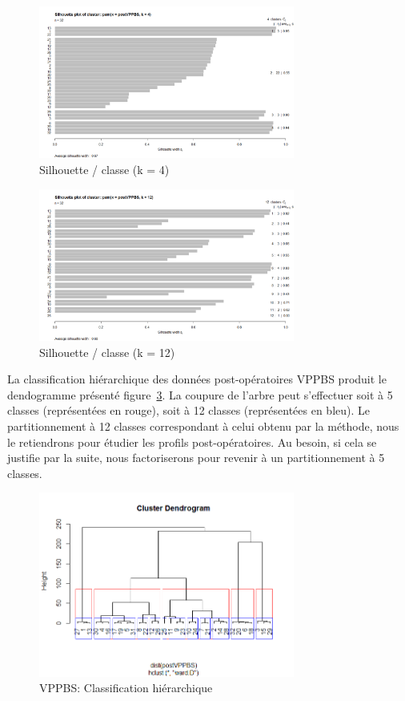 \begin{figure}[H]
\centering
\includegraphics[width=0.75\textwidth]{../Fig/VPPBS/vppbs-sil-k4-post.png}
\caption{Silhouette / classe (k = 4)}
\label{fig-vppbs-post-pam-k4}
\end{figure}


\begin{figure}[H]
\centering
\includegraphics[width=0.75\textwidth]{../Fig/VPPBS/vppbs-sil-k12-post.png}
\caption{Silhouette / classe (k = 12)}
\label{fig-vppbs-post-pam-k12}
\end{figure}

La classification hiérarchique des données post-opératoires VPPBS produit le dendogramme présenté figure~\ref{fig-vppbs-post-cah}. La coupure de l'arbre peut s'effectuer soit à 5 classes (représentées en rouge), soit à 12 classes (représentées en bleu). Le partitionnement à 12 classes correspondant à celui obtenu par la méthode, nous le retiendrons pour étudier les profils post-opératoires. Au besoin, si cela se justifie par la suite, nous factoriserons pour revenir à un partitionnement à 5 classes.

\begin{figure}[H]
\centering
\includegraphics[width=0.75\textwidth]{../Fig/VPPBS/vppbs-cah-k12-post.png}
\caption{VPPBS: Classification hiérarchique}
\label{fig-vppbs-post-cah}
\end{figure}

%
